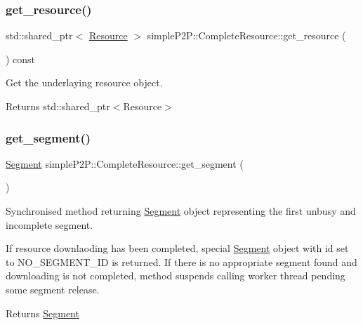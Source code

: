 \subsubsection{\texorpdfstring{get\+\_\+resource()}{get\_resource()}}
{\footnotesize\ttfamily std\+::shared\+\_\+ptr$<$ \hyperlink{classsimpleP2P_1_1Resource}{Resource} $>$ simple\+P2\+P\+::\+Complete\+Resource\+::get\+\_\+resource (\begin{DoxyParamCaption}{ }\end{DoxyParamCaption}) const}



Get the underlaying resource object. 

\begin{DoxyReturn}{Returns}
std\+::shared\+\_\+ptr$<$\+Resource$>$ 
\end{DoxyReturn}
\mbox{\label{classsimpleP2P_1_1CompleteResource_aabe86fbdc8daab23c1df0bc2abb91e7d}} 
\subsubsection{\texorpdfstring{get\+\_\+segment()}{get\_segment()}}
{\footnotesize\ttfamily \hyperlink{classsimpleP2P_1_1Segment}{Segment} simple\+P2\+P\+::\+Complete\+Resource\+::get\+\_\+segment (\begin{DoxyParamCaption}{ }\end{DoxyParamCaption})}



Synchronised method returning \hyperlink{classsimpleP2P_1_1Segment}{Segment} object representing the first unbusy and incomplete segment. 

If resource downlaoding has been completed, special \hyperlink{classsimpleP2P_1_1Segment}{Segment} object with id set to N\+O\+\_\+\+S\+E\+G\+M\+E\+N\+T\+\_\+\+ID is returned. If there is no appropriate segment found and downloading is not completed, method suspends calling worker thread pending some segment release.

\begin{DoxyReturn}{Returns}
\hyperlink{classsimpleP2P_1_1Segment}{Segment} 
\end{DoxyReturn}
\mbox{\label{classsimpleP2P_1_1CompleteResource_aaa20fce1d1d3fbd3f616debaedcaf7a3}} 
